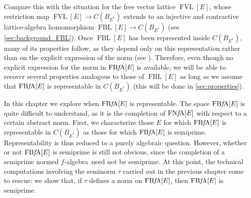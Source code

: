 \documentclass{memo-l}
\theoremstyle{definition}
\theoremstyle{remark}
\numberwithin{section}{chapter}
\numberwithin{equation}{chapter}
\newcommand{\falg}{$f\!$-algebra}
\newcommand{\FNFA}[1]{\operatorname{FN{\it f}\!A}[#1]}
\newcommand{\FBFA}[1]{\operatorname{FB{\it f}\!A}[#1]}
\newcommand{\FVLv}[1]{\operatorname{FVL}[#1]}
\newcommand{\FBL}[1]{\operatorname{FBL}[#1]}
\begin{document}
Compare this with the situation for the free vector lattice $\FVLv
E$, whose restriction map $\FVLv E\to C(B_{E^{*}})$ extends to an
injective and contractive lattice-algebra homomorphism $\FBL E\to
C(B_{E^{*}})$ (see \cref{sec:background_FBL}). Once $\FBL E$ has
been represented inside $C(B_{E^{*}})$, many of its properties
follow, as they depend only on this representation rather than on
the explicit expression of the norm (see \cite{oikhberg_etal2022}).
Therefore, even though no explicit expression for the norm in $\FBFA
E$ is available, we will be able to recover several properties
analogous to those of $\FBL E$ as long as we assume that $\FBFA E$ is
representable in $C(B_{E^{*}})$ (this will be done in
\cref{sec:properties}).

In this chapter we explore when $\FBFA E$ is representable. The
space $\FBFA E$ is quite difficult to understand, as it is the
completion of $\FNFA E$ with respect to a certain abstract norm.
First, we characterize those $E$ for which $\FBFA E$ is
representable in $C(B_{E^{*}})$ as those for which $\FBFA E$ is
semiprime. Representability is thus reduced to a purely algebraic
question. However, whether or not $\FBFA E$ is semiprime is still
not obvious, since the completion of a semiprime normed \falg\ need
not be semiprime. At this point, the technical computations
involving the seminorm $\tau $ carried out in the previous chapter
come to rescue: we show that, if $\tau $ defines a norm on $\FBFA
E$, then $\FBFA E$ is semiprime.
\end{document}
